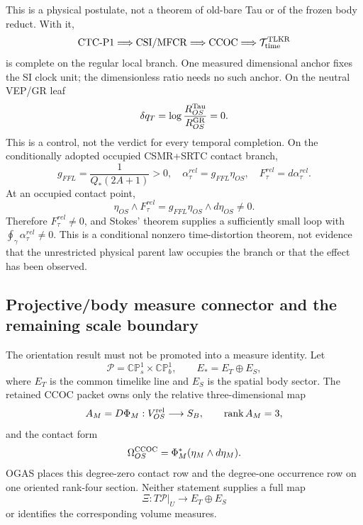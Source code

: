 \documentclass[11pt]{article}
\begin{document}
This is a physical postulate, not a theorem of old-bare Tau or of the frozen
body reduct. With it,
\begin{equation}
 \mathrm{CTC\mbox{-}P1}\Longrightarrow\mathrm{CSI/MFCR}
 \Longrightarrow\mathrm{CCOC}
 \Longrightarrow\mathcal T_{\rm time}^{\rm TLKR}
 \label{eq:mvp-closure}
\end{equation}
is complete on the regular local branch. One measured dimensional anchor
fixes the SI clock unit; the dimensionless ratio needs no such anchor. On the
neutral VEP/GR leaf
\begin{equation}
 \delta q_T=\log\frac{R_{OS}^{\rm Tau}}{R_{OS}^{\rm GR}}=0.
 \label{eq:neutral-prediction}
\end{equation}
This is a control, not the verdict for every temporal completion. On the
conditionally adopted occupied CSMR+SRTC contact branch,
\begin{equation}
 g_{FFL}=\frac{1}{Q_*(2A+1)}>0,
 \quad \alpha_\tau^{rel}=g_{FFL}\eta_{OS},
 \quad F_\tau^{rel}=d\alpha_\tau^{rel}.
 \label{eq:enriched-clock-curvature}
\end{equation}
At an occupied contact point,
\begin{equation}
 \eta_{OS}\wedge F_\tau^{rel}
 =g_{FFL}\eta_{OS}\wedge d\eta_{OS}\ne0.
 \label{eq:nonzero-clock-curvature}
\end{equation}
Therefore $F_\tau^{rel}\ne0$, and Stokes' theorem supplies a sufficiently
small loop with $\oint_\gamma\alpha_\tau^{rel}\ne0$. This is a conditional
nonzero time-distortion theorem, not evidence that the unrestricted physical
parent law occupies the branch
or that the effect has been observed.

\subsection{Projective/body measure connector and the remaining scale boundary}

The orientation result must not be promoted into a measure identity.  Let
\begin{equation}
 \mathcal P=\mathbb{CP}^{1}_{s}\times\mathbb{CP}^{1}_{b},
 \qquad E_*=E_T\oplus E_S,
 \label{eq:projective-body-domains}
\end{equation}
where $E_T$ is the common timelike line and $E_S$ is the spatial body sector.
The retained CCOC packet owns only the relative three-dimensional map
\begin{equation}
 A_M=D\Phi_M:V_{OS}^{\rm rel}\longrightarrow S_B,
 \qquad \operatorname{rank}A_M=3,
 \label{eq:ccoc-three-map}
\end{equation}
and the contact form
\begin{equation}
 \Omega_{OS}^{\rm CCOC}=\Phi_M^*(\eta_M\wedge d\eta_M).
 \label{eq:ccoc-contact-form}
\end{equation}
OGAS places this degree-zero contact row and the degree-one occurrence row on
one oriented rank-four section.  Neither statement supplies a full map
\begin{equation}
 \Xi:T\mathcal P|_U\longrightarrow E_T\oplus E_S
 \label{eq:full-projective-body-connector}
\end{equation}
or identifies the corresponding volume measures.
\end{document}
